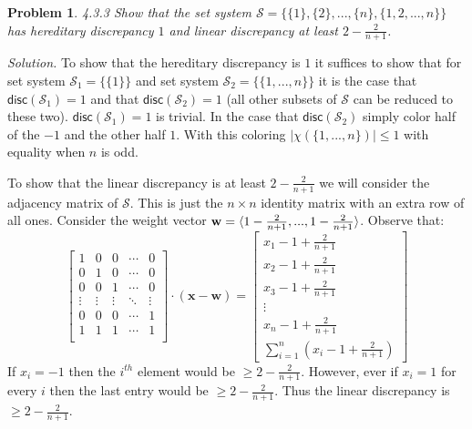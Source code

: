 \documentclass[11pt]{article}
\newcommand\disc{\mathsf{disc}}
\newcommand\SSet{\mathcal{S}}
\newtheorem{problem}{Problem}
\DeclarePairedDelimiter\anglebrac{\langle}{\rangle}
\begin{document}
\begin{problem}
4.3.3 Show that the set system $\SSet = \{\{1\}, \{2\}, ..., \{n\}, \{1, 2, ..., n\}\}$ has hereditary discrepancy $1$ and linear discrepancy at least $2 - \frac{2}{n+1}$.
\end{problem}
\emph{Solution.} To show that the hereditary discrepancy is $1$ it suffices to show that for set system $\SSet_1 = \{\{1\}\}$ and set system $\SSet_2 = \{\{1, ..., n\}\}$ it is the case that $\disc(\SSet_1) = 1$ and that $\disc(\SSet_2) = 1$ (all other subsets of $\SSet$ can be reduced to these two). $\disc(\SSet_1) = 1$ is trivial. In the case that $\disc(\SSet_2)$ simply color half of the $-1$ and the other half $1$. With this coloring $|\chi(\{1, ..., n\})| \leq 1$ with equality when $n$ is odd. 

To show that the linear discrepancy is at least $2-\frac{2}{n+1}$ we will consider the adjacency matrix of $\SSet$. This is just the $n \times n$ identity matrix with an extra row of all ones. Consider the weight vector $\mathbf{w} = \anglebrac{1 - \frac{2}{n+1}, ..., 1 - \frac{2}{n+1}}$. Observe that:
\[
\begin{bmatrix}
1 & 0 & 0 & \cdots & 0\\
0 & 1 & 0 & \cdots & 0\\
0 & 0 & 1 & \cdots & 0\\
\vdots & \vdots & \vdots & \ddots & \vdots\\
0 & 0 & 0 & \cdots & 1\\
1 & 1 & 1 & \cdots & 1\\
\end{bmatrix}
\cdot \left(\mathbf{x} - \mathbf{w}\right)
=
\begin{bmatrix}
x_1 - 1 + \frac{2}{n+1}\\
x_2 - 1 + \frac{2}{n+1}\\
x_3 - 1 + \frac{2}{n+1}\\
\vdots \\
x_n - 1 + \frac{2}{n+1}\\
\sum_{i=1}^{n} \left(x_i - 1 + \frac{2}{n+1}\right)
\end{bmatrix}
\]
If $x_i = -1$ then the $i^{th}$ element would be $\geq 2 - \frac{2}{n+1}$. However, ever if $x_i = 1$ for every $i$ then the last entry would be $\geq 2 - \frac{2}{n+1}$. Thus the linear discrepancy is $\geq 2 - \frac{2}{n+1}$.
\end{document}
